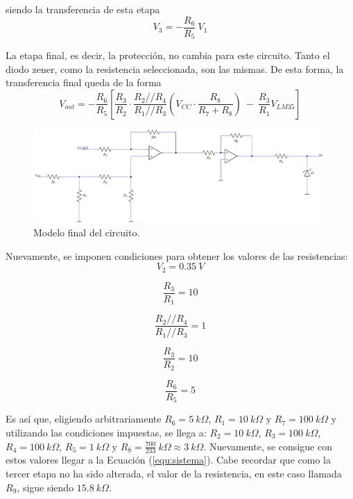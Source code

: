 \documentclass[a4paper]{article}
\begin{document}
siendo la transferencia de esta etapa
\[
	V_3 = - \frac{R_6}{R_5} \ V_1
\]

La etapa final, es decir, la protección, no cambia para este circuito. Tanto el diodo zener, como la resistencia seleccionada, son las mismas. De esta forma, la transferencia final queda de la forma
\begin{equation}
	V_{out} = - \frac{R_6}{R_5} \left[ \frac{R_3}{R_2} \cdot \frac{R_2 // R_4}{R_1 // R_3} \left( V_{CC} \cdot \frac{R_8}{R_7 + R_8} \right) \ - \ \frac{R_3}{R_1} V_{LM35} \right]
	\label{equ:transfm2}
\end{equation}

\begin{figure}[H]
	\centering
	\includegraphics[width=0.99\textwidth]{Ejercicio6/Imagenes/CircuitoFinal-M2.png}
	\caption{Modelo final del circuito.}
	\label{fig:cirfin-M2}
\end{figure}

Nuevamente, se imponen condiciones para obtener los valores de las resistencias:
\begin{equation}
	V_2 = 0.35 \ V
	\label{equ:condm2-1}
\end{equation}

\begin{equation}
	\frac{R_3}{R_1} = 10
	\label{equ:condm2-2}
\end{equation}

\begin{equation}
	\frac{R_2 // R_4}{R_1 // R_3} = 1
	\label{equ:condm3-3}
\end{equation}

\begin{equation}
	\frac{R_3}{R_2} = 10
	\label{equ:condm2-4}
\end{equation}

\begin{equation}
	\frac{R_6}{R_5} = 5
	\label{equ:condm2-5}
\end{equation}

Es así que, eligiendo arbitrariamente $R_6 = 5 \ k\Omega$, $R_1 = 10 \ k\Omega$ y $R_7 = 100 \ k\Omega$ y utilizando las condiciones impuestas, se llega a: $R_2 = 10 \ k\Omega$, $R_3 = 100 \ k\Omega$, $R_4 = 100 \ k\Omega$, $R_5 = 1 \ k\Omega$ y $R_8 = \frac{700}{233} \ k\Omega \approx 3 \ k\Omega$. Nuevamente, se consigue con estos valores llegar a la Ecuación (\ref{equ:sistema}). Cabe recordar que como la tercer etapa no ha sido alterada, el valor de la resistencia, en este caso llamada $R_9$, sigue siendo $15.8 \ k\Omega$.
\end{document}
